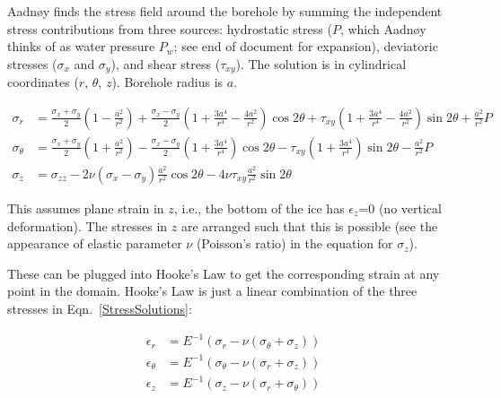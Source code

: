 \documentclass[11pt]{article}
\begin{document}
Aadn\o{}y finds the stress field around the borehole by summing the independent stress contributions from three sources: hydrostatic stress ($P$, which Aadn\o{}y thinks of as water pressure $P_w$; see end of document for expansion), deviatoric stresses ($\sigma_x$ and $\sigma_y$), and shear stress ($\tau_{xy}$).  The solution is in cylindrical coordinates ($r$, $\theta$, $z$).  Borehole radius is $a$.  

\begin{equation}
	\begin{aligned}
	\sigma_r &= \frac{\sigma_x+\sigma_y}{2}\left(1-\frac{a^2}{r^2}\right) + \frac{\sigma_x-\sigma_y}{2}\left(1+\frac{3a^4}{r^4}-\frac{4a^2}{r^2}\right) \cos2\theta + \tau_{xy}\left(1+\frac{3a^4}{r^4}-\frac{4a^2}{r^2}\right)\sin2\theta + \frac{a^2}{r^2}P \\
	\sigma_\theta &= \frac{\sigma_x+\sigma_y}{2}\left(1+\frac{a^2}{r^2}\right) - \frac{\sigma_x-\sigma_y}{2}\left(1+\frac{3a^4}{r^4}\right) \cos2\theta - \tau_{xy}\left(1+\frac{3a^4}{r^4}\right)\sin2\theta - \frac{a^2}{r^2}P \\
	\sigma_z &= \sigma_{zz} -2\nu\left(\sigma_x-\sigma_y\right)\frac{a^2}{r^2}\cos2\theta - 4\nu\tau_{xy}\frac{a^2}{r^2}\sin2\theta
	\end{aligned}
\label{StressSolutions}
\end{equation}

\noindent This assumes plane strain in $z$, i.e., the bottom of the ice has $\epsilon_z$=0 (no vertical deformation).  The stresses in $z$ are arranged such that this is possible (see the appearance of elastic parameter $\nu$ (Poisson's ratio) in the equation for $\sigma_z$).

These can be plugged into Hooke's Law to get the corresponding strain at any point in the domain.  Hooke's Law is just a linear combination of the three stresses in Eqn.~\ref{StressSolutions}:

\begin{equation}
	\begin{aligned}
	\epsilon_r &= E^{-1}\left(\sigma_r - \nu \left(\sigma_\theta + \sigma_z \right)\right) \\
	\epsilon_\theta &= E^{-1}\left(\sigma_\theta - \nu \left(\sigma_r + \sigma_z \right)\right) \\
	\epsilon_z &= E^{-1}\left(\sigma_z - \nu \left(\sigma_r + \sigma_\theta \right)\right)
	\end{aligned}
\label{Hooke}
\end{equation}
\end{document}
